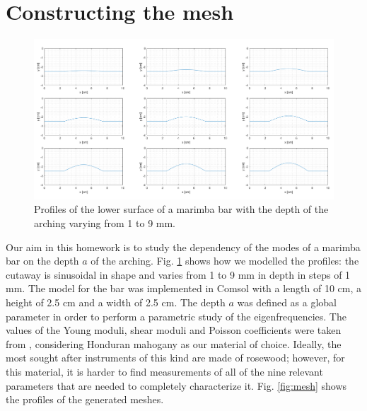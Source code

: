 \documentclass[a4paper]{article}
\begin{document}
\section{Constructing the mesh}

\begin{figure}[h]
	\centering
	\includegraphics[width=0.7\linewidth]{barshapes.png}
	\caption{Profiles of the lower surface of a marimba bar with the depth of the arching varying from 1 to 9 mm.}
	\label{fig:profiles}
\end{figure}

Our aim in this homework is to study the dependency of the modes of a marimba bar on the depth $a$ of the arching. Fig. \ref{fig:profiles} shows how we modelled the profiles: the cutaway is sinusoidal in shape and varies from 1 to 9 mm in depth in steps of 1 mm. The model for the bar was implemented in Comsol with a length of 10 cm, a height of 2.5 cm and a width of 2.5 cm. The depth $a$ was defined as a global parameter in order to perform a parametric study of the eigenfrequencies. The values of the Young moduli, shear moduli and Poisson coefficients were taken from \cite{wood}, considering Honduran mahogany as our material of choice. Ideally, the most sought after instruments of this kind are made of rosewood; however, for this material, it is harder to find measurements of all of the nine relevant parameters that are needed to completely characterize it. Fig. \ref{fig:mesh} shows the profiles of the generated meshes.
\end{document}
